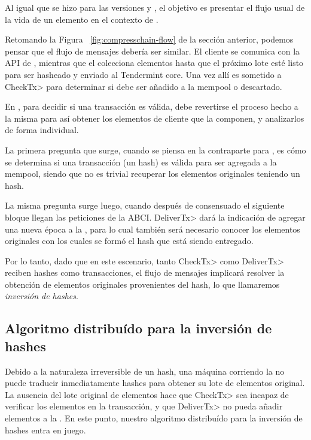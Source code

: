Al igual que se hizo para las versiones \vanilla y \compresschain, el objetivo es presentar el flujo usual
de la vida de un elemento en el contexto de \hashchain.

%

Retomando la Figura ~\ref{fig:compresschain-flow} de la sección anterior, podemos pensar que el flujo de mensajes
debería ser similar. El cliente se comunica con la API de \setchain, mientras que el \hcollector colecciona elementos
hasta que el próximo lote esté listo para ser hasheado y enviado al Tendermint core.
Una vez allí es sometido a
\<CheckTx> para determinar si debe ser añadido a la mempool o descartado.

%

En \compresschain, para decidir si una transacción es válida, debe revertirse el proceso hecho a la misma para
así obtener los elementos de cliente que la componen, y analizarlos de forma individual.

%

La primera pregunta que surge, cuando se piensa en la contraparte para \hashchain, es cómo se determina si una
transacción (un hash) es válida para ser agregada a la mempool, siendo que no es trivial recuperar los
elementos originales teniendo un hash.

%

La misma pregunta surge luego,
cuando después de consensuado el siguiente bloque llegan las peticiones de la ABCI.
%
\<DeliverTx> dará la indicación de agregar una nueva época a la \setchain, para lo cual también
será necesario conocer los elementos originales con los cuales se formó el hash que está siendo entregado.

Por lo tanto, dado que en este escenario, tanto \<CheckTx> como \<DeliverTx> reciben hashes como transacciones,
el flujo de mensajes implicará resolver la obtención de elementos originales provenientes del hash, lo que llamaremos
\textit{inversión de hashes}.


\subsection{Algoritmo distribuído para la inversión de hashes}

%
%
Debido a la naturaleza irreversible de un hash, una máquina corriendo la \setchain no puede traducir
inmediatamente hashes para obtener su lote de elementos original.
%
La ausencia del lote original de elementos hace que \<CheckTx> sea incapaz de verificar los elementos
en la transacción, y que \<DeliverTx> no pueda añadir elementos a la \setchain.
%
En este punto, nuestro algoritmo distribuído para la inversión de hashes entra en juego.
%

